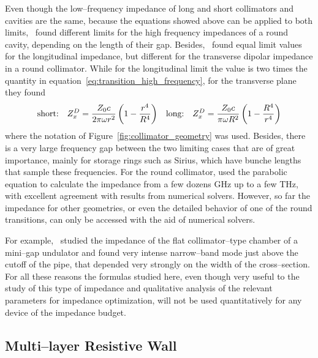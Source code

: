     Even though the low--frequency impedance of long and short collimators and cavities are the same, because the equations showed above can be applied to both limits,~ found different limits for the high frequency impedances of a round cavity, depending on the length of their gap. Besides,~ found equal limit values for the longitudinal impedance, but different for the transverse dipolar impedance in a round collimator. While for the longitudinal limit the value is two times the quantity in equation~\eqref{eq:transition_high_frequency}, for the transverse plane they found
    \begin{align}
        \text{short:}\quad Z_x^D = \frac{Z_0c}{2\pi\omega r^2}\left(1-\frac{r^4}{R^4}\right) &&
        \text{long:}\quad Z_x^D = \frac{Z_0c}{\pi\omega R^2}\left(1-\frac{R^4}{r^4}\right)
    \end{align}
    where the notation of Figure~\ref{fig:collimator_geometry} was used. Besides, there is a very large frequency gap between the two limiting cases that are of great importance, mainly for storage rings such as Sirius, which have bunche lengths that sample these frequencies. For the round collimator,  used the parabolic equation to calculate the impedance from a few dozens \si{\giga\hertz} up to a few \si{\tera\hertz}, with excellent agreement with results from numerical solvers. However, so far the impedance for other geometries, or even the detailed behavior of one of the round transitions, can only be accessed with the aid of numerical solvers.

    For example,~ studied the impedance of the flat collimator--type chamber of a mini--gap undulator and found very intense narrow--band mode just above the cutoff of the pipe, that depended very strongly on the width of the cross--section. For all these reasons the formulas studied here, even though very useful to the study of this type of impedance and qualitative analysis of the relevant parameters for impedance optimization, will not be used quantitatively for any device of the impedance budget.

\subsection{Multi--layer Resistive Wall}

